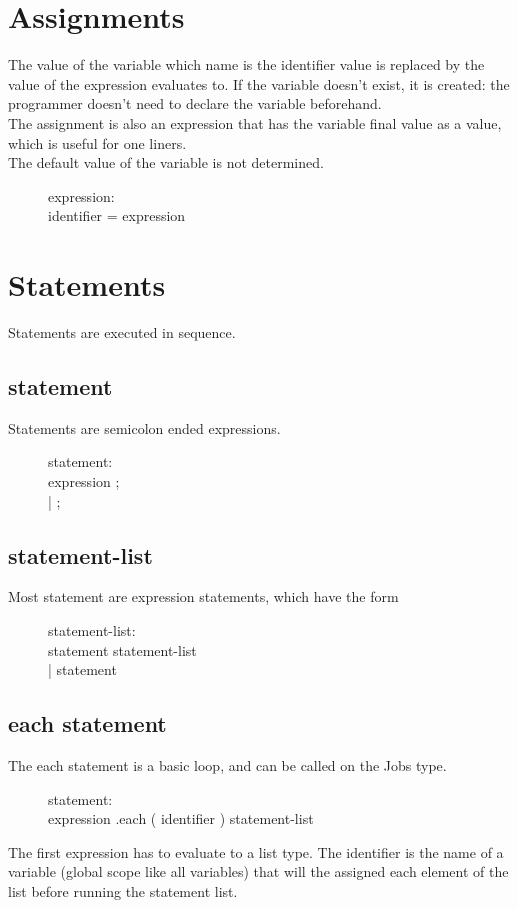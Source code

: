 \section{Assignments}
The value of the variable which name is the identifier value is replaced by the value of the expression
evaluates to. If the variable doesn't exist, it is created: the programmer doesn't need to declare the
variable beforehand.\\
The assignment is also an expression that has the variable final value as a value, which is useful for
one liners.\\
The default value of the variable is not determined.
\begin{description}
  \item[]expression: \hfill \\
    identifier = expression
\end{description}

\section{Statements}
Statements are executed in sequence.

\subsection{statement}
Statements are semicolon ended expressions.
\begin{description}
  \item[]statement: \hfill \\
    expression ; \\
    | ;
\end{description}

\subsection{statement-list}
Most statement are expression statements, which have the form
\begin{description}
  \item[]statement-list: \hfill \\
    statement statement-list \\
    | statement
\end{description}

\subsection{each statement}
The each statement is a basic loop, and can be called on the Jobs type.
\begin{description}
  \item[]statement: \hfill \\
    expression .each ( identifier ) { statement-list }
\end{description}
The first expression has to evaluate to a list type. The identifier is the name
of a variable (global scope like all variables) that will the assigned each
element of the list before running the statement list.

